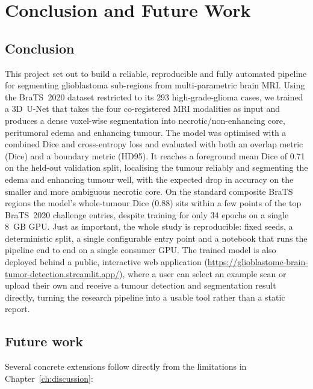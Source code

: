 \chapter{Conclusion and Future Work}
\label{ch:conclusion}

\section{Conclusion}

This project set out to build a reliable, reproducible and fully automated
pipeline for segmenting glioblastoma sub-regions from multi-parametric brain MRI.
Using the BraTS~2020 dataset restricted to its 293 high-grade-glioma cases, we
trained a 3D~U-Net that takes the four co-registered MRI modalities as input and
produces a dense voxel-wise segmentation into necrotic/non-enhancing core,
peritumoral edema and enhancing tumour. The model was optimised with a combined
Dice and cross-entropy loss and evaluated with both an overlap metric (Dice) and a
boundary metric (HD95). It reaches a foreground mean Dice of 0.71 on the held-out
validation split, localising the tumour reliably and segmenting the edema and
enhancing tumour well, with the expected drop in accuracy on the smaller and more
ambiguous necrotic core. On the standard composite BraTS regions the model's
whole-tumour Dice (0.88) sits within a few points of the top BraTS~2020
challenge entries, despite training for only 34 epochs on a single 8~GB GPU.
Just as important, the whole study is reproducible: fixed seeds, a
deterministic split, a single configurable entry point and a notebook that
runs the pipeline end to end on a single consumer GPU. The trained model is
also deployed behind a public, interactive web application
(\url{https://glioblastome-brain-tumor-detection.streamlit.app/}), where a user
can select an example scan or upload their own and receive a tumour detection
and segmentation result directly, turning the research pipeline into a usable
tool rather than a static report.

\section{Future work}

Several concrete extensions follow directly from the limitations in
Chapter~\ref{ch:discussion}:

